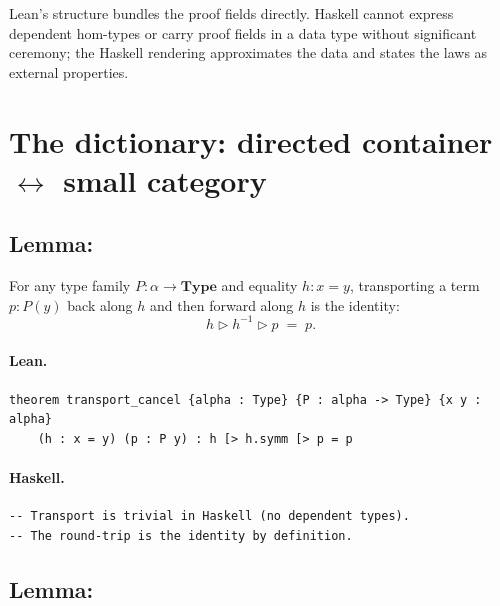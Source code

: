 \documentclass[11pt,a4paper]{article}
\begin{document}
\begin{fidelitynote}
Lean's structure bundles the proof fields directly.  Haskell cannot express
dependent hom-types or carry proof fields in a data type without significant
ceremony; the Haskell rendering approximates the data and states the laws as
external properties.
\end{fidelitynote}


\section{The dictionary: directed container \texorpdfstring{$\leftrightarrow$}{<->} small category}

\subsection{Lemma: }

\begin{prop}
For any type family $P : \alpha \to \mathbf{Type}$ and equality $h : x = y$,
transporting a term $p : P(y)$ back along $h$ and then forward along $h$ is
the identity:
\[
  h \triangleright h^{-1} \triangleright p \;=\; p.
\]
\end{prop}

\paragraph{Lean.}
\begin{lstlisting}[style=lean]
theorem transport_cancel {alpha : Type} {P : alpha -> Type} {x y : alpha}
    (h : x = y) (p : P y) : h [> h.symm [> p = p
\end{lstlisting}

\paragraph{Haskell.}
\begin{lstlisting}[style=haskell]
-- Transport is trivial in Haskell (no dependent types).
-- The round-trip is the identity by definition.
\end{lstlisting}


\subsection{Lemma: }
\end{document}
